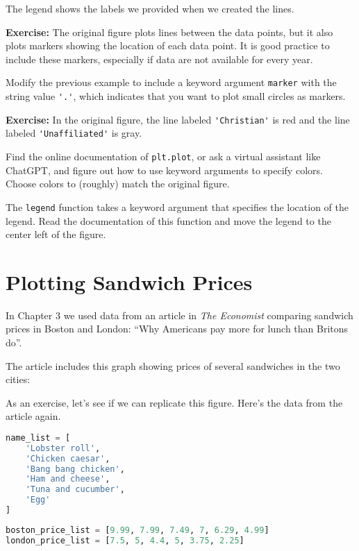 The legend shows the labels we provided when we created the lines.

\textbf{Exercise:} The original figure plots lines between the data
points, but it also plots markers showing the location of each data
point. It is good practice to include these markers, especially if data
are not available for every year.

Modify the previous example to include a keyword argument
\passthrough{\lstinline!marker!} with the string value
\passthrough{\lstinline!'.'!}, which indicates that you want to plot
small circles as markers.

\textbf{Exercise:} In the original figure, the line labeled
\passthrough{\lstinline!'Christian'!} is red and the line labeled
\passthrough{\lstinline!'Unaffiliated'!} is gray.

Find the online documentation of \passthrough{\lstinline!plt.plot!}, or
ask a virtual assistant like ChatGPT, and figure out how to use keyword
arguments to specify colors. Choose colors to (roughly) match the
original figure.

The \passthrough{\lstinline!legend!} function takes a keyword argument
that specifies the location of the legend. Read the documentation of
this function and move the legend to the center left of the figure.

\section{Plotting Sandwich Prices}\label{plotting-sandwich-prices}

In Chapter 3 we used data from an article in \emph{The Economist}
comparing sandwich prices in Boston and London: ``Why Americans pay more
for lunch than Britons do''.

The article includes this graph showing prices of several sandwiches in
the two cities:

As an exercise, let's see if we can replicate this figure. Here's the
data from the article again.

\begin{lstlisting}[language=Python,style=source]
name_list = [
    'Lobster roll',
    'Chicken caesar',
    'Bang bang chicken',
    'Ham and cheese',
    'Tuna and cucumber',
    'Egg'
]
\end{lstlisting}

\begin{lstlisting}[language=Python,style=source]
boston_price_list = [9.99, 7.99, 7.49, 7, 6.29, 4.99]
london_price_list = [7.5, 5, 4.4, 5, 3.75, 2.25]
\end{lstlisting}

